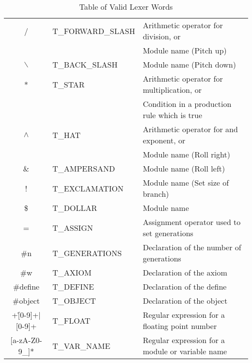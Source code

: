 \begin{flushleft}
\begin{table}[h!]
\begin{tabular}{ | c | l | l |}
\hline
	/ 				& T\_FORWARD\_SLASH 	& Arithmetic operator for division, or\\
					&						& Module name (Pitch up)\\
\hline
	$\backslash$ 		& T\_BACK\_SLASH 		& Module name (Pitch down)\\
\hline
	* 				& T\_STAR 				& Arithmetic operator for multiplication, or\\
					&						& Condition in a production rule which is true\\
\hline
	$\land$ 		& T\_HAT 				& Arithmetic operator for and exponent, or\\
					&						& Module name (Roll right)\\
\hline
	$\&$ 			& T\_AMPERSAND 			& Module name (Roll left)\\
\hline
	! 				& T\_EXCLAMATION 		& Module name (Set size of branch)\\
\hline
	\$ 				& T\_DOLLAR 			& Module name \\
\hline
	= 				& T\_ASSIGN 			& Assignment operator used to set generations\\
\hline
	\#n 			& T\_GENERATIONS 		& Declaration of the number of generations\\
\hline
	\#w 			& T\_AXIOM 				& Declaration of the axiom\\
\hline
	\#define 			& T\_DEFINE 		& Declaration of the define\\
\hline
	\#object 			& T\_OBJECT			& Declaration of the object\\
\hline
	[0-9]+\.[0-9]+|[0-9]+ 					& T\_FLOAT 				& Regular expression for a floating point number\\
\hline
	[a-zA-Z\_][a-zA-Z0-9\_]*  				& T\_VAR\_NAME 			& Regular expression for a module or variable name\\
\hline
\hline
\end{tabular}
\caption{Table of Valid Lexer Words}
\label{lexer words}
\end{table}
\FloatBarrier


\end{flushleft}
